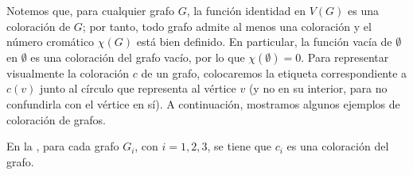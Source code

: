 Notemos que, para cualquier grafo $G$, la función identidad en $V(G)$ es una coloración de $G$; por tanto, todo grafo admite al menos una coloración y el número cromático $\chi(G)$ está bien definido. En particular, la función vacía de $\emptyset$ en $\emptyset$ es una coloración del grafo vacío, por lo que $\chi(\emptyset) = 0$. Para representar visualmente la coloración $c$ de un grafo, colocaremos la etiqueta correspondiente a $c(v)$ junto al círculo que representa al vértice $v$ (y no en su interior, para no confundirla con el vértice en sí). A continuación, mostramos algunos ejemplos de coloración de grafos.
\begin{Ejm}
   En la , para cada grafo $G_i$, con $i=1,2,3$, se tiene que $c_i$ es una coloración del grafo.
   
\end{Ejm}
